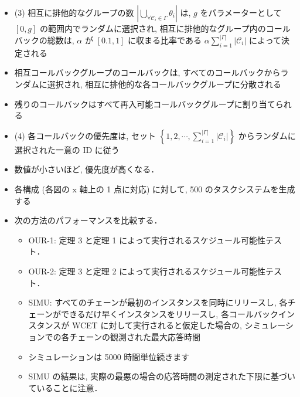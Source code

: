 \begin{frame}{}
    \begin{itemize}
        \item (3) 相互に排他的なグループの数 $\left|\bigcup_{\forall \mathcal{C}_{i} \in \Gamma} \theta_{i}\right|$ は, $g$ をパラメーターとして $[0, g]$ の範囲内でランダムに選択され, 相互に排他的なグループ内のコールバックの総数は, $\alpha$ が $[0.1,1]$ に収まる比率である $\alpha \sum_{i=1}^{|\Gamma|}\left|\mathcal{C}_{i}\right|$ によって決定される
\item 相互コールバックグループのコールバックは, すべてのコールバックからランダムに選択され, 相互に排他的な各コールバックグループに分散される
\item 残りのコールバックはすべて再入可能コールバックグループに割り当てられる
\item (4) 各コールバックの優先度は, セット $\left\{1,2, \cdots, \sum_{i=1}^{|\Gamma|}\left|\mathcal{C}_{i}\right|\right\}$ からランダムに選択された一意の ID に従う
\item 数値が小さいほど, 優先度が高くなる．
    \end{itemize}
\end{frame}

\begin{frame}{}
    \begin{itemize}
        \item 各構成 (各図の $\mathrm{x}$ 軸上の 1 点に対応) に対して, 500 のタスクシステムを生成する
\item 次の方法のパフォーマンスを比較する．
              \begin{itemize}
                  \item  OUR-1: 定理 3 と定理 1 によって実行されるスケジュール可能性テスト．

                  \item  OUR-2: 定理 3 と定理 2 によって実行されるスケジュール可能性テスト．

                  \item  SIMU: すべてのチェーンが最初のインスタンスを同時にリリースし, 各チェーンができるだけ早くインスタンスをリリースし, 各コールバックインスタンスが WCET に対して実行されると仮定した場合の, シミュレーションでの各チェーンの観測された最大応答時間
\item シミュレーションは 5000 時間単位続きます
\item SIMU の結果は, 実際の最悪の場合の応答時間の測定された下限に基づいていることに注意．

              \end{itemize}
    \end{itemize}
\end{frame}

